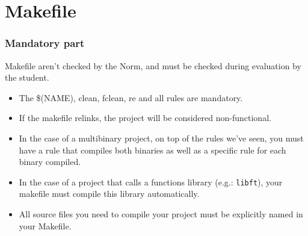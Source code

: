 \documentclass{42-en}
\begin{document}
    \section{Makefile}

        \subsubsection{Mandatory part}
            Makefile aren't checked by the Norm, and must be checked during evaluation by 
            the student.
            \begin{itemize}

                \item The \$(NAME), clean, fclean, re and all
                  rules are mandatory.

		        \item If the makefile relinks, the project will be considered
                  non-functional.

      		    \item In the case of a multibinary project, on top of the
                  rules we've seen, you must have a rule that compiles
                  both binaries as well as a specific rule for each
                  binary compiled.

      		    \item In the case of a project that calls a functions library
                  (e.g.: \texttt{libft}), your makefile must compile
                  this library automatically.

      		    \item All source files you need to compile your project must
		            be explicitly named in your Makefile.

            \end{itemize}
\end{document}
